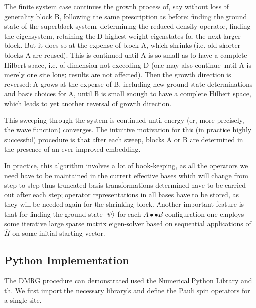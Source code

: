 \documentclass{article}
\begin{document}
\noindent The finite system case continues the growth process of, say without loss of generality block B, following the same prescription as before: finding the ground state of the superblock system, determining the reduced density operator, finding the eigensystem, retaining the D highest weight eigenstates for the next larger block. But it does so at the expense of block A, which shrinks (i.e. old shorter blocks A are reused). This is continued until A is so small as to have a complete Hilbert space, i.e. of dimension not exceeding D (one may also continue until A is merely one site long; results are not affected). Then the growth direction is reversed: A grows at the expense of B, including new ground state determinations and basis choices for A, until B is small enough to have a complete Hilbert space, which leads to yet another reversal of growth direction. 

\vspace{1em}

\noindent This sweeping through the system is continued until energy (or, more precisely, the wave function) converges. The intuitive motivation for this (in practice highly successful) procedure is that after each sweep, blocks A or B are determined in the presence of an ever improved embedding. 

\vspace{1em} 

\noindent In practice, this algorithm involves a lot of book-keeping, as all the operators we need have to be maintained in the current effective bases which will change from step to step thus truncated basis transformations determined have to be carried out after each step; operator representations in all bases have to be stored, as they will be needed again for the shrinking block. Another important feature is that for finding the ground state $\ket{\psi}$ for each $A\bullet\bullet B$ configuration one employs some iterative large sparse matrix eigen-solver based on sequential applications of $\hat{H}$ on some initial starting vector.

\subsection{Python Implementation}

\noindent The DMRG procedure can demonstrated used the Numerical Python Library and th. We first import the necessary library's and define the Pauli spin operators for a single site. 

\vspace{1em}
\end{document}
